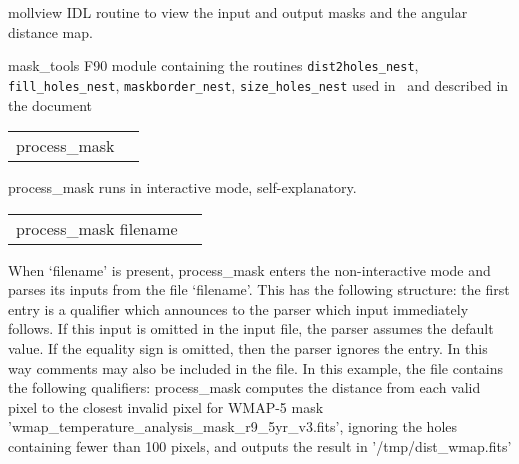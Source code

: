 \begin{support}
  \begin{sulist}{} %
  \item[mollview] IDL routine to view the input and output masks and the angular
distance map.
  \item[mask\_tools] F90 module containing the routines   
	{\tt dist2holes\_nest}, %
	{\tt fill\_holes\_nest}, %
	{\tt maskborder\_nest}, %
	{\tt size\_holes\_nest}  %
used in \thedocid\ and
described in the  document
  \end{sulist}
\end{support}

\begin{examples}{1}
{
\begin{tabular}{ll} %
process\_mask  \\
\end{tabular}
}
{
process\_mask runs in interactive mode, self-explanatory.
}
\end{examples}


\begin{examples}{2}
{
\begin{tabular}{ll} %
process\_mask  filename \\
\end{tabular}
}
{When `filename' is present, process\_mask enters the non-interactive mode and parses
its inputs from the file `filename'. This has the following
structure: the first entry is a qualifier which announces to the parser
which input immediately follows. If this input is omitted in the
input file, the parser assumes the default value.
If the equality sign is omitted, then the parser ignores the entry.
In this way comments may also be included in the file.
In this example, the file contains the following qualifiers:\hfill\newline
{}
}
process\_mask computes the distance from each valid pixel to the closest invalid
pixel for WMAP-5 mask 'wmap\_temperature\_analysis\_mask\_r9\_5yr\_v3.fits', ignoring
the holes containing fewer than 100 pixels, and outputs the result in '/tmp/dist\_wmap.fits'
\end{examples}

